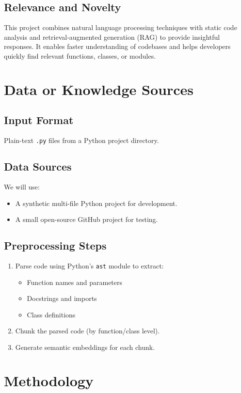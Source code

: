 \documentclass[11pt]{article}
\begin{document}
\subsection*{Relevance and Novelty}
This project combines natural language processing techniques with static code analysis and retrieval-augmented generation (RAG) to provide insightful responses. It enables faster understanding of codebases and helps developers quickly find relevant functions, classes, or modules.

\section{Data or Knowledge Sources}
\subsection*{Input Format}
Plain-text \texttt{.py} files from a Python project directory.

\subsection*{Data Sources}
We will use:
\begin{itemize}[noitemsep]
  \item A synthetic multi-file Python project for development.
  \item A small open-source GitHub project for testing.
\end{itemize}

\subsection*{Preprocessing Steps}
\begin{enumerate}[noitemsep]
  \item Parse code using Python’s \texttt{ast} module to extract:
    \begin{itemize}[noitemsep]
      \item Function names and parameters
      \item Docstrings and imports
      \item Class definitions
    \end{itemize}
  \item Chunk the parsed code (by function/class level).
  \item Generate semantic embeddings for each chunk.
\end{enumerate}

\section{Methodology}
\end{document}
